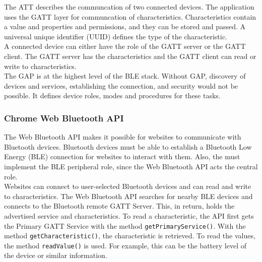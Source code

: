 The ATT describes the communcation of two connected devices. The application uses the GATT layer for communcation of characteristics. Characteristics contain a value and properties and permissions, and they can be stored and passed. \cite{BTGatt} A universal unique identifier (UUID) defines the type of the characteristic. \\
A connected device can either have the role of the GATT server or the GATT client. \cite{TIGatt}   The GATT server has the characteristics and the GATT client can read or write to characteristics. \\
The GAP is at the highest level of the BLE stack. Without GAP, discovery of devices and services, establishing the connection, and security would not be possible. It defines device roles, modes and procedures for these tasks. \cite{DBLP:journals/sensors/GomezOP12}


\subsubsection*{Chrome Web Bluetooth API}
The Web Bluetooth API makes it possible for websites to communicate with Bluetooth devices. Bluetooth devices must be able to establish a Bluetooth Low Energy (BLE) connection for websites to interact with them. Also, the must implement the BLE peripheral role, since the Web Bluetooth API acts the central role. \cite{BTAPIMozilla} \\
Websites can connect to user-selected Bluetooth devices and can read and write to characteristics. The Web Bluetooth API searches for nearby BLE devices and connects to the Bluetooth remote GATT Server. This, in return, holds the advertised service and characteristics. To read a characteristic, the API first gets the Primary GATT Service with the method \texttt{getPrimaryService()}. With the method \texttt{getCharacteristic()}, the characteristic is retrieved. To read the values, the method \texttt{readValue()} is used. For example, this can be the battery level of the device or similar information. \cite{WebBTAPI}